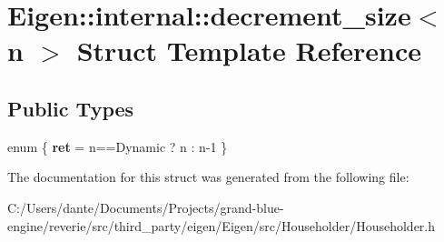 \hypertarget{struct_eigen_1_1internal_1_1decrement__size}{}\section{Eigen\+::internal\+::decrement\+\_\+size$<$ n $>$ Struct Template Reference}
\label{struct_eigen_1_1internal_1_1decrement__size}
\subsection*{Public Types}
\begin{DoxyCompactItemize}
\item 
\mbox{\label{struct_eigen_1_1internal_1_1decrement__size_a255deabd3d09db015eaa92b169e5a321}} 
enum \{ {\bfseries ret} = n==Dynamic ? n \+: n-\/1
 \}
\end{DoxyCompactItemize}


The documentation for this struct was generated from the following file\+:\begin{DoxyCompactItemize}
\item 
C\+:/\+Users/dante/\+Documents/\+Projects/grand-\/blue-\/engine/reverie/src/third\+\_\+party/eigen/\+Eigen/src/\+Householder/Householder.\+h\end{DoxyCompactItemize}
